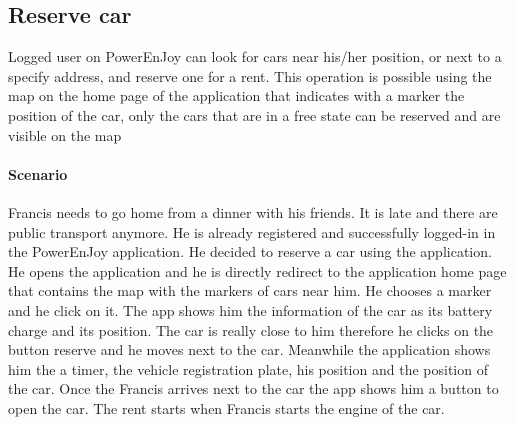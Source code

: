 \subsection{Reserve car}
Logged user on PowerEnJoy can look for cars near his/her position, or next to a specify address, and reserve one for a rent. This operation is possible using the map on the home page of the application that indicates with a marker the position of the car, only the cars that are in a free state can be reserved and are visible on the map
\paragraph{Scenario}
Francis needs to go home from a dinner with his friends. It is late and there are public transport anymore. He is already registered and successfully logged-in in the PowerEnJoy application. He decided to reserve a car using the application. He opens the application and he is directly redirect to the application home page that contains the map with the markers of cars near him. He chooses a marker and he click on it. The app shows him the information of the car as its battery charge and its position. The car is really close to him therefore he clicks on the button reserve and he moves next to the car. Meanwhile the application shows him the  a timer, the vehicle registration plate, his position and the position of the car. Once the Francis arrives next to the car the app shows him a button to open the car. The rent starts when Francis starts the engine of the car.
